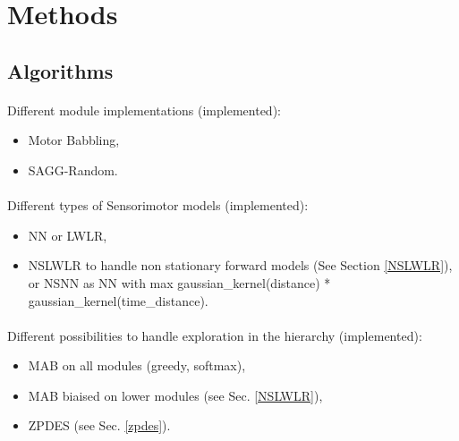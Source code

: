 \documentclass[conference]{include/IEEEtran}
\begin{document}
%


	
\section{Methods}
	
	\subsection{Algorithms}
	
		\paragraph{}
		Different module implementations (implemented):
		\begin{itemize}
			\item Motor Babbling,
			\item SAGG-Random.
		\end{itemize}
		
		\paragraph{}
		Different types of Sensorimotor models (implemented):
		\begin{itemize}
			\item NN or LWLR,
			\item NSLWLR to handle non stationary forward models (See Section \ref{NSLWLR}), or NSNN as NN with max gaussian\_kernel(distance) * gaussian\_kernel(time\_distance).
		\end{itemize}
		
		\paragraph{}
		Different possibilities to handle exploration in the hierarchy (implemented):
		\begin{itemize}
			\item MAB on all modules (greedy, softmax),
			\item MAB biaised on lower modules (see Sec. \ref{NSLWLR}),
			\item ZPDES (see Sec. \ref{zpdes}).
		\end{itemize}
		
\end{document}
